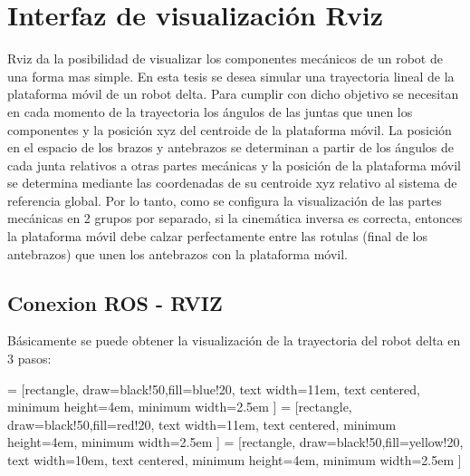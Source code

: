         \newpage
    
    

    \newpage

\section{Interfaz de visualización Rviz}

    Rviz da la posibilidad de visualizar los componentes mecánicos de un robot de una forma mas simple. En esta tesis se desea simular una trayectoria lineal de la plataforma móvil de un robot delta. Para cumplir con dicho objetivo se necesitan en cada momento de la trayectoria los ángulos de las juntas que unen los componentes y la posición xyz del centroide de la plataforma móvil. La posición en el espacio de los brazos y antebrazos se determinan a partir de los ángulos de cada junta relativos a otras partes mecánicas y la posición de la plataforma móvil se determina mediante las coordenadas de su centroide xyz relativo al sistema de referencia global. Por lo tanto, como se configura la visualización de las partes mecánicas en 2 grupos por separado, si la cinemática inversa es correcta, entonces la plataforma móvil debe calzar perfectamente entre las rotulas (final de los antebrazos) que unen los antebrazos con la plataforma móvil.
     
   \subsection{Conexion ROS - RVIZ}
   
           Básicamente se puede obtener la visualización de la trayectoria del robot delta en 3 pasos:


         = [rectangle, draw=black!50,fill=blue!20, text width=11em, text centered, minimum height=4em, minimum width=2.5em ]
         = [rectangle, draw=black!50,fill=red!20, text width=11em, text centered, minimum height=4em, minimum width=2.5em ]
         = [rectangle, draw=black!50,fill=yellow!20, text width=10em, text centered, minimum height=4em, minimum width=2.5em ]
        
